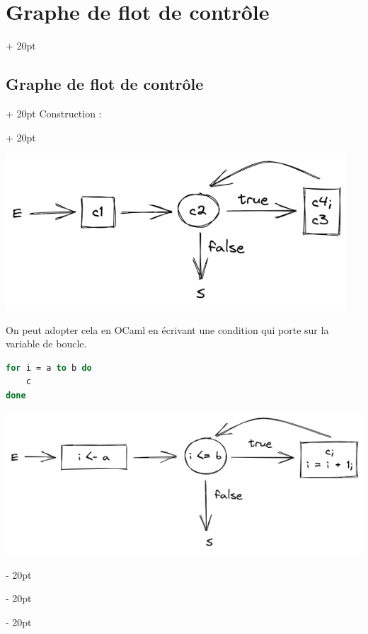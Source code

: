 \documentclass[a4paper, 12pt, twoside]{article}
\renewcommand{\le}{\leqslant}
\newcommand{\ind}[1][20pt]{\advance\leftskip + #1}
\newcommand{\deind}[1][20pt]{\advance\leftskip - #1}
\newenvironment{indentedenv}[1][20pt]{\par \ind[#1]}{\par \deind}
\newenvironment{indt}[2][20pt]{#2 \begin{indentedenv}[#1]}{\end{indentedenv}} %
\begin{document}
\begin{indt}{\section{Graphe de flot de contrôle}}
\begin{indt}{\subsection{Graphe de flot de contrôle}}
\begin{indt}{Construction :}
                \begin{center}
                    \includegraphics[scale=0.4]{draw/draw1.png}
                \end{center}
                
                On peut adopter cela en OCaml en écrivant une condition qui porte sur la variable de boucle.
                
                \begin{lstlisting}[language=Caml, xleftmargin=80pt]
for i = a to b do
    c
done\end{lstlisting}
                
                
                \begin{center}
                    \includegraphics[scale=.4]{draw/draw_for_caml.png}
                \end{center}
                

\end{indt}
\end{indt}
\end{indt}
\end{document}
